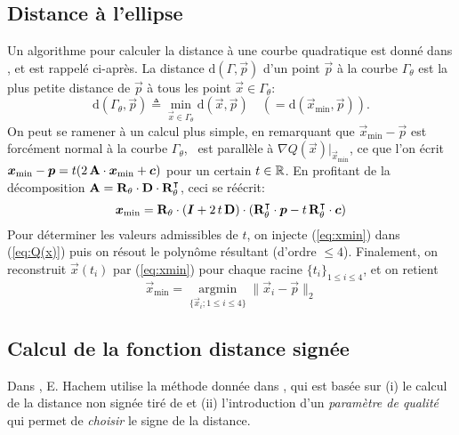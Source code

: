 \documentclass[10pt,a4paper]{article}
\begin{document}
\subsection{Distance à l'ellipse}
%
Un algorithme pour calculer la distance à une courbe quadratique est donné dans \cite[, page 217]{schneider2002geometric}, et est rappelé ci-après.
%
La distance $\mathrm d(\Gamma, \vec{p})$ d'un point $\vec{p}$ à la courbe $\Gamma_\theta$ est la plus petite distance de $\vec{p}$ à tous les point $\vec x \in \Gamma_\theta$:
\begin{equation}
\mathrm d(\Gamma_\theta, \vec{p}) \triangleq \min_{\vec{x}\in\Gamma_\theta} \mathrm{d}(\vec{x}, \vec{p}) \quad (=\mathrm{d}(\vec{x}_{\mathrm{min}}, \vec{p})).
\end{equation}
On peut se ramener à un calcul plus simple, en remarquant que $\vec{x}_\mathrm{min}-\vec{p}$ est forcément normal à la courbe $\Gamma_\theta$, \ie~est parallèle à $\nabla Q(\vec{x})\vert_{\vec{x}_\mathrm{min}}$, ce que l'on écrit $\boldsymbol{x}_\mathrm{min}-\boldsymbol{p}=t(2\,\mathbf{A} \cdot \boldsymbol{x}_{\mathrm{min}} + \boldsymbol{c})$ pour un certain $t \in \mathbb{R}$.
%
En profitant de la décomposition $\mathbf{A} = \mathbf{R} _\theta \cdot \mathbf{D} \cdot \mathbf{R}_\theta ^\intercal$, ceci se réécrit:
\begin{equation}
\label{eq:xmin}
\boldsymbol{x}_{\mathrm{min}} = \mathbf{R} _\theta \cdot( \boldsymbol{I} + 2\, t\,\mathbf{D})\cdot (\mathbf{R} _\theta^\intercal \cdot \boldsymbol{p}-t\,\mathbf{R} _\theta^\intercal \cdot \boldsymbol{c})
\end{equation}
%
Pour déterminer les valeurs admissibles de $t$, on injecte (\ref{eq:xmin}) dans (\ref{eq:Q(x)}) puis on résout le polynôme résultant (d'ordre $\leq 4$).
%
Finalement, on reconstruit $\vec{x}(t_i)$ par (\ref{eq:xmin}) pour chaque racine $\{t_i\}_{1\leq i \leq 4}$, et on retient 
$$\vec{x}_{\mathrm{min}} = \underset{\{\vec x_i; {1\leq i \leq 4}\}}{\operatorname{argmin}}\parallel \vec{x}_i-\vec p\parallel_2$$


\subsection{Calcul de la fonction distance signée}
Dans \cite{hachem2013immersed}, E. Hachem utilise la méthode donnée dans \cite[Appendix A]{bruchon2009using}, qui est basée sur (i) le calcul de la distance non signée tiré de \cite{schneider2002geometric} et (ii) l'introduction d'un \emph{paramètre de qualité} qui permet de \emph{choisir} le signe de la distance.
%
\\
\end{document}
